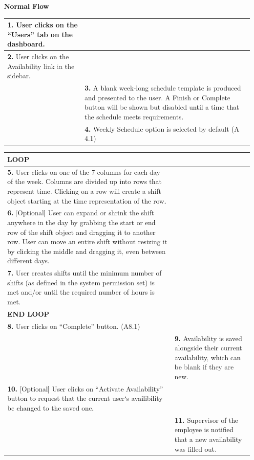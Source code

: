 \documentclass[letterpaper,12pt]{report}
\begin{document}
{ \centering \textbf{Normal Flow}
\begin{center}
\xuchead
\begin{tabular}{| p{8.5cm} | p{8.5cm} |}
\hline
\textbf{1.} User clicks on the ``Users'' tab on the dashboard. & \\
\hline
\textbf{2.} User clicks on the Availability link in the sidebar. & \\
\hline
& \textbf{3.} A blank week-long schedule template is produced and presented to the user. A Finish or Complete button will be shown but disabled until a time that the schedule meets requirements. \\
\hline
& \textbf{4.} Weekly Schedule option is selected by default (A 4.1) \\
\hline
\end{tabular}
\end{center}
\pagebreak

\begin{center}
\xuchead
\begin{tabular}{| p{8.5cm} | p{8.5cm} |}
\hline
\textbf{LOOP} & \\
\hline
\textbf{5.} User clicks on one of the 7 columns for each day of the week. Columns are divided up into rows that represent time. Clicking on a row will create a shift object starting at the time representation of the row. & \\
\hline
\textbf{6.} [Optional] User can expand or shrink the shift anywhere in the day by grabbing the start or end row of the shift object and dragging it to another row. User can move an entire shift without resizing it by clicking the middle and dragging it, even between different days. & \\
\hline
\textbf{7.} User creates shifts until the minimum number of shifts (as defined in the system\index{system} permission set) is met and/or until the required number of hours is met. & \\
\hline
\textbf{END LOOP} & \\
\hline
\textbf{8.} User clicks on ``Complete'' button. (A8.1) & \\
\hline
& \textbf{9.} Availability is saved alongside their current availability, which can be blank if they are new. \\
\hline
\textbf{10.} [Optional] User clicks on ``Activate Availability'' button to request that the current user`s availibility be changed to the
saved one. & \\
\hline
& \textbf{11.} Supervisor of the employee is notified that a new availability was filled out. \\
\hline
\end{tabular}
\end{center}

}
\end{document}
